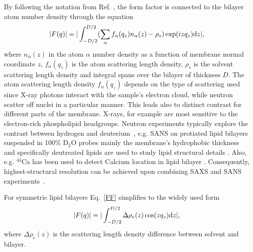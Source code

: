 \documentclass[aps,prl,superscriptaddress,twocolumn]{revtex4}
\begin{document}
By following the notation from Ref. \cite{kucerka10}, the form factor is connected to the bilayer atom number density through the 
equation 
\begin{equation}\label{FF}
|F(q)|=|\int_{-D/2}^{D/2}(\sum_\alpha f_\alpha(q_z)n_\alpha(z) - \rho_s) \exp(i z q_z) {\rm d}z|,
\end{equation}
where $n_\alpha(z)$ in the atom $\alpha$ number density as a function of membrane normal coordinate $z$,
$f_\alpha(q_z)$ is the atom scattering length density,
$\rho_s$ is the solvent scattering length density and integral spans over the bilayer of thickness $D$.
The atom scattering length density $f_\alpha(q_z)$ depends on the type of scattering used since
X-ray photons interact with the sample's electron cloud, while neutron scatter off nuclei in a particular manner.
This leads also to distinct contrast for different parts of the membrane. X-rays, for example are most sensitive to the electron-rich 
phospholipid headgroups. Neutron experiments typically explore the contrast between hydrogen and deuterium~\cite{marquardt15},
e.g. SANS on protiated lipid bilayers suspended in 100\% D$_2$O probes mainly the membrane's hydrophobic thickness
and specifically deutreated lipids are used to study lipid structural details \cite{buldt78,buldt79}.
Also, e.g. $^{44}$Ca has been used to detect Calcium location in lipid bilayer \cite{herbette84}.
Consequently, highest-structural resolution can be achieved upon combining SAXS and SANS experiments~\cite{kucerka05a,kucerka08a}.

For symmetric lipid bilayers Eq.~\ref{FF} simplifies to the widely used form
\begin{equation}\label{FFsimpl}
|F(q)|=|\int_{-D/2}^{D/2}\Delta \rho_e(z) \cos(zq_z) {\rm d}z|,
\end{equation}
where $\Delta \rho_e(z)$ is the scattering length density difference between solvent and bilayer.



\end{document}
